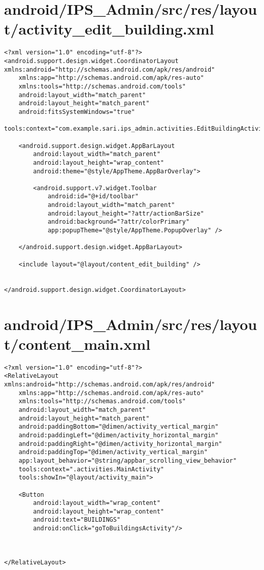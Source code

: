 \section{android/IPS\_Admin/src/res/layout/activity\_edit\_building.xml}
\begin{lstlisting}<?xml version="1.0" encoding="utf-8"?>
<android.support.design.widget.CoordinatorLayout xmlns:android="http://schemas.android.com/apk/res/android"
    xmlns:app="http://schemas.android.com/apk/res-auto"
    xmlns:tools="http://schemas.android.com/tools"
    android:layout_width="match_parent"
    android:layout_height="match_parent"
    android:fitsSystemWindows="true"
    tools:context="com.example.sari.ips_admin.activities.EditBuildingActivity">

    <android.support.design.widget.AppBarLayout
        android:layout_width="match_parent"
        android:layout_height="wrap_content"
        android:theme="@style/AppTheme.AppBarOverlay">

        <android.support.v7.widget.Toolbar
            android:id="@+id/toolbar"
            android:layout_width="match_parent"
            android:layout_height="?attr/actionBarSize"
            android:background="?attr/colorPrimary"
            app:popupTheme="@style/AppTheme.PopupOverlay" />

    </android.support.design.widget.AppBarLayout>

    <include layout="@layout/content_edit_building" />


</android.support.design.widget.CoordinatorLayout>
\end{lstlisting}
\newpage
\section{android/IPS\_Admin/src/res/layout/content\_main.xml}
\begin{lstlisting}<?xml version="1.0" encoding="utf-8"?>
<RelativeLayout xmlns:android="http://schemas.android.com/apk/res/android"
    xmlns:app="http://schemas.android.com/apk/res-auto"
    xmlns:tools="http://schemas.android.com/tools"
    android:layout_width="match_parent"
    android:layout_height="match_parent"
    android:paddingBottom="@dimen/activity_vertical_margin"
    android:paddingLeft="@dimen/activity_horizontal_margin"
    android:paddingRight="@dimen/activity_horizontal_margin"
    android:paddingTop="@dimen/activity_vertical_margin"
    app:layout_behavior="@string/appbar_scrolling_view_behavior"
    tools:context=".activities.MainActivity"
    tools:showIn="@layout/activity_main">

    <Button
        android:layout_width="wrap_content"
        android:layout_height="wrap_content"
        android:text="BUILDINGS"
        android:onClick="goToBuildingsActivity"/>



</RelativeLayout>
\end{lstlisting}
\newpage
